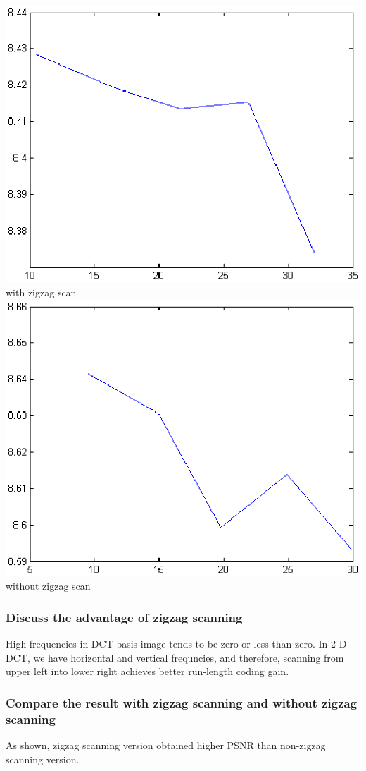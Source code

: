 \documentclass[12pt]{article}
\begin{document}
\begin{center}
\includegraphics{../images/III2CRvsPSNR.eps}\\
with zigzag scan\\
\includegraphics{../images/III2CRvsPSNRNoZigzag.eps}\\
without zigzag scan\\
\end{center}

\subsubsection{Discuss the advantage of zigzag scanning}

High frequencies in DCT basis image tends to be zero or less than zero. 
In 2-D DCT, we have horizontal and vertical frequncies, and therefore, scanning from upper left into lower right achieves better run-length coding gain.

\subsubsection{Compare the result with zigzag scanning and without zigzag scanning}

As shown, zigzag scanning version obtained higher PSNR than non-zigzag scanning version. 
\end{document}
